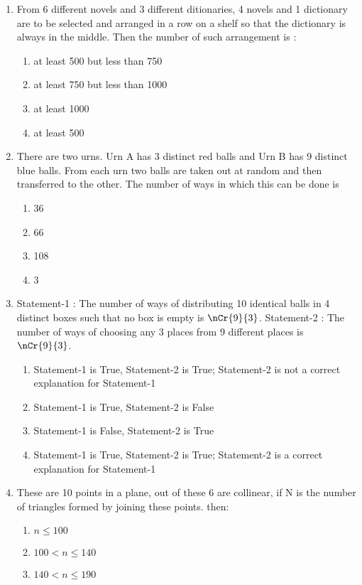 \begin{enumerate}[label=\arabic*.,ref=\thesubsection.\theenumi]
\item From 6 different novels and 3 different ditionaries, 4 novels and 1 dictionary are to be selected and arranged in a row on a shelf so that the dictionary is always in the middle. Then the number of such arrangement is :
\begin{enumerate}
\item at least 500 but less than 750
\item at least 750 but less than 1000
\item at least 1000
\item at least 500\\ 
\end{enumerate}
\item There are two urns. Urn A has 3 distinct red balls and Urn B has 9 distinct blue balls. From each urn two balls are taken out at random and then transferred to the other. The number of ways in which this can be done is
\begin{enumerate}
\item 36
\item 66 
\item 108
\item 3\\
\end{enumerate}
\item Statement-1 :  The number of ways of distributing 10 identical balls in 4 distinct boxes such that no box is empty is $\nCr{9}{3}$.
Statement-2 : The number of ways of choosing any 3 places from 9 different places is $\nCr{9}{3}$.
\begin{enumerate}
\item Statement-1 is True, Statement-2 is True; Statement-2 is not a correct explanation for Statement-1
\item Statement-1 is True, Statement-2 is False
\item Statement-1 is False, Statement-2 is True
\item Statement-1 is True, Statement-2 is True; Statement-2 is a correct explanation for Statement-1\\
\end{enumerate} 
\item These are 10 points in a plane, out of these 6 are collinear, if N is the number of triangles formed by joining these points. then:
\begin{enumerate}
\item $n \leq 100$
\item $100 < n \leq 140$
\item $140 < n \leq 190$

\end{enumerate}
\end{enumerate}
